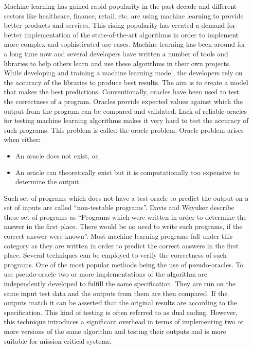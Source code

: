 Machine learning has gained rapid popularity in the past decade and different sectors like healthcare, finance, retail, etc. are using machine learning to provide better products and services. This rising popularity has created a demand for better implementation of the state-of-the-art algorithms in order to implement more complex and sophisticated use cases. Machine learning has been around for a long time now and several developers have written a number of tools and libraries to help others learn and use these algorithms in their own projects.  While developing and training a machine learning model, the developers rely on the accuracy of the libraries to produce best results. The aim is to create a model that makes the best predictions.
Conventionally, oracles have been used to test the correctness of a program. Oracles provide expected values against which the output from the program can be compared and validated. Lack of reliable oracles for testing machine learning algorithms makes it very hard to test the accuracy of such programs. This problem is called the oracle problem\cite{Weyuker}. Oracle problem arises when either:
\begin{itemize}
  \item An oracle does not exist, or,
  \item An oracle can theoretically exist but it is computationally too expensive to determine the output.
\end{itemize}
Such set of programs which does not have a test oracle to predict the output on a set of inputs are called \enquote{non-testable programs}\cite{Murphy}. Davis and Weyuker describe these set of programs as \enquote{Programs which were written in order to determine the answer in the first place. There would be no need to write such programs, if the correct answer were known}\cite{}. Most machine learning programs fall under this category as they are written in order to predict the correct answers in the first place. Several techniques can be employed to verify the correctness of such programs. One of the most popular methods being the use of pseudo-oracles. To use pseudo-oracle two or more implementations of the algorithm are independently developed to fulfill the same specification. They are run on the same input test data and the outputs from them are then compared. If the outputs match it can be asserted that the original results are according to the specification. This kind of testing is often referred to as dual coding. However, this technique introduces a significant overhead in terms of implementing two or more versions of the same algorithm and testing their outputs and is more suitable for mission-critical systems\cite{Weyuker}.\newline

